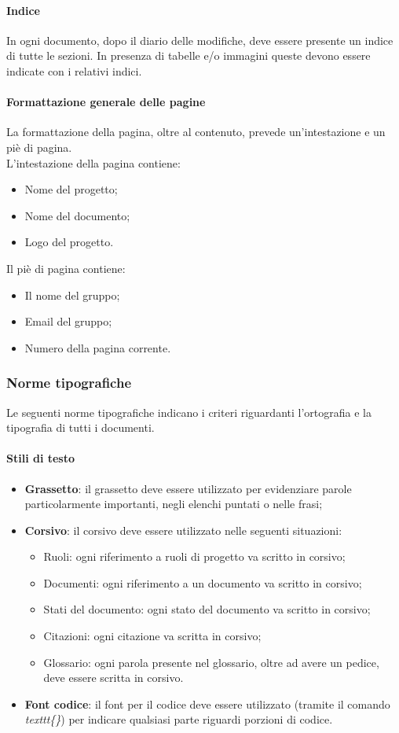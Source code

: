 \paragraph{Indice}
In ogni documento, dopo il diario delle modifiche, deve essere presente un
indice di tutte le sezioni. In presenza di tabelle e/o immagini queste devono
essere indicate con i relativi indici.

\paragraph{Formattazione generale delle pagine}
La formattazione della pagina, oltre al contenuto, prevede un'intestazione e un
piè di pagina. \\
L'intestazione della pagina contiene:
\begin{itemize}
  \item Nome del progetto;
  \item Nome del documento;
  \item Logo del progetto.
\end{itemize}
Il piè di pagina contiene:
\begin{itemize}
  \item Il nome del gruppo;
  \item Email del gruppo;
  \item Numero della pagina corrente.
\end{itemize}

\subsubsection{Norme tipografiche}
Le seguenti norme tipografiche indicano i criteri riguardanti
l'ortografia e la tipografia di tutti i documenti.
\paragraph{Stili di testo}
\begin{itemize}
  \item \textbf{Grassetto}: il grassetto deve essere utilizzato per evidenziare parole
  particolarmente importanti, negli elenchi puntati o nelle frasi;
  \item \textbf{Corsivo}: il corsivo deve essere utilizzato nelle seguenti
  situazioni:
  \begin{itemize}
    \item Ruoli: ogni riferimento a ruoli di progetto va scritto in corsivo;
    \item Documenti: ogni riferimento a un documento va scritto in corsivo;
    \item Stati del documento: ogni stato del documento va scritto in corsivo;
    \item Citazioni: ogni citazione va scritta in corsivo;
    \item Glossario: ogni parola presente nel glossario, oltre ad avere un pedice, deve
    essere scritta in corsivo.
  \end{itemize}
  \item \textbf{Font codice}: il font per il codice deve essere utilizzato (tramite il comando \textit{\/texttt\{\}}) per indicare qualsiasi parte riguardi porzioni di codice.
\end{itemize}
